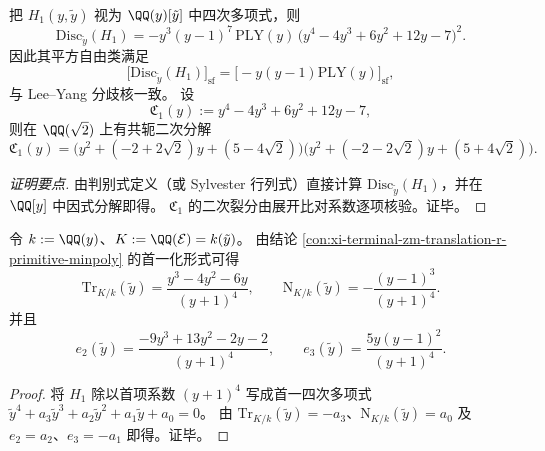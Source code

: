 \begin{conclusion}\label{con:xi-terminal-zm-translation-r-discriminant-factorization}
把 \(H_{1}(y,\tilde y)\) 视为 \(\QQ(y)[\tilde y]\) 中四次多项式，则
\[
\boxed{
\mathrm{Disc}_{\tilde y}(H_{1})
=-y^{3}(y-1)^{7}\,\mathrm{PLY}(y)\,
\bigl(y^{4}-4y^{3}+6y^{2}+12y-7\bigr)^{2}.
}
\]
因此其平方自由类满足
\[
\bigl[\mathrm{Disc}_{\tilde y}(H_{1})\bigr]_{\mathrm{sf}}
=\bigl[-y(y-1)\mathrm{PLY}(y)\bigr]_{\mathrm{sf}},
\]
与 Lee--Yang 分歧核一致。
设
\[
\mathfrak C_{1}(y):=y^{4}-4y^{3}+6y^{2}+12y-7,
\]
则在 \(\QQ(\sqrt2)\) 上有共轭二次分解
\[
\boxed{
\mathfrak C_{1}(y)=
\bigl(y^{2}+(-2+2\sqrt2)y+(5-4\sqrt2)\bigr)
\bigl(y^{2}+(-2-2\sqrt2)y+(5+4\sqrt2)\bigr).
}
\]
\end{conclusion}
\begin{proof}[证明要点]
由判别式定义（或 Sylvester 行列式）直接计算 \(\mathrm{Disc}_{\tilde y}(H_{1})\)，并在 \(\QQ[y]\) 中因式分解即得。
\(\mathfrak C_{1}\) 的二次裂分由展开比对系数逐项核验。证毕。
\end{proof}

\begin{corollary}\label{cor:xi-terminal-zm-translation-r-trace-norm}
令 \(k:=\QQ(y)\)、\(K:=\QQ(\mathcal E)=k(\tilde y)\)。
由结论 \ref{con:xi-terminal-zm-translation-r-primitive-minpoly} 的首一化形式可得
\[
\mathrm{Tr}_{K/k}(\tilde y)=\frac{y^{3}-4y^{2}-6y}{(y+1)^{4}},
\qquad
\mathrm{N}_{K/k}(\tilde y)=-\frac{(y-1)^{3}}{(y+1)^{4}}.
\]
并且
\[
e_{2}(\tilde y)=\frac{-9y^{3}+13y^{2}-2y-2}{(y+1)^{4}},
\qquad
e_{3}(\tilde y)=\frac{5y(y-1)^{2}}{(y+1)^{4}}.
\]
\end{corollary}
\begin{proof}
将 \(H_{1}\) 除以首项系数 \((y+1)^{4}\) 写成首一四次多项式
\(
\tilde y^{4}+a_{3}\tilde y^{3}+a_{2}\tilde y^{2}+a_{1}\tilde y+a_{0}=0
\)。
由 \(\mathrm{Tr}_{K/k}(\tilde y)=-a_{3}\)、\(\mathrm{N}_{K/k}(\tilde y)=a_{0}\) 及
\(e_{2}=a_{2}\)、\(e_{3}=-a_{1}\) 即得。证毕。
\end{proof}

